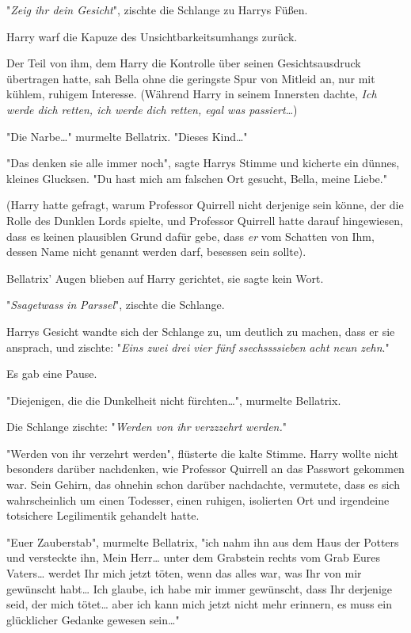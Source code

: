 {"\emph{Zeig ihr dein Gesicht}", zischte die Schlange zu Harrys Füßen.

Harry warf die Kapuze des Unsichtbarkeitsumhangs zurück.

Der Teil von ihm, dem Harry die Kontrolle über seinen Gesichtsausdruck übertragen hatte, sah Bella ohne die geringste Spur von Mitleid an, nur mit kühlem, ruhigem Interesse. (Während Harry in seinem Innersten dachte, \emph{Ich werde dich retten, ich werde dich retten, egal was passiert}…)

"Die Narbe…" murmelte Bellatrix. "Dieses Kind…"

"Das denken sie alle immer noch", sagte Harrys Stimme und kicherte ein dünnes, kleines Glucksen. "Du hast mich am falschen Ort gesucht, Bella, meine Liebe."

(Harry hatte gefragt, warum Professor Quirrell nicht derjenige sein könne, der die Rolle des Dunklen Lords spielte, und Professor Quirrell hatte darauf hingewiesen, dass es keinen plausiblen Grund dafür gebe, dass \emph{er} vom Schatten von Ihm, dessen Name nicht genannt werden darf, besessen sein sollte).

Bellatrix' Augen blieben auf Harry gerichtet, sie sagte kein Wort.

"\emph{Ssagetwass} \emph{in} \emph{Parssel}", zischte die Schlange.

Harrys Gesicht wandte sich der Schlange zu, um deutlich zu machen, dass er sie ansprach, und zischte: "\emph{Eins zwei drei vier fünf} \emph{ssechssssieben} \emph{acht neun zehn}."

Es gab eine Pause.

"Diejenigen, die die Dunkelheit nicht fürchten…", murmelte Bellatrix.

Die Schlange zischte: "\emph{Werden von ihr} \emph{verzzzehrt} \emph{werden.}"

"Werden von ihr verzehrt werden", flüsterte die kalte Stimme. Harry wollte nicht besonders darüber nachdenken, wie Professor Quirrell an das Passwort gekommen war. Sein Gehirn, das ohnehin schon darüber nachdachte, vermutete, dass es sich wahrscheinlich um einen Todesser, einen ruhigen, isolierten Ort und irgendeine totsichere Legilimentik gehandelt hatte.

"Euer Zauberstab", murmelte Bellatrix, "ich nahm ihn aus dem Haus der Potters und versteckte ihn, Mein Herr… unter dem Grabstein rechts vom Grab Eures Vaters… werdet Ihr mich jetzt töten, wenn das alles war, was Ihr von mir gewünscht habt… Ich glaube, ich habe mir immer gewünscht, dass Ihr derjenige seid, der mich tötet… aber ich kann mich jetzt nicht mehr erinnern, es muss ein glücklicher Gedanke gewesen sein…"

}
